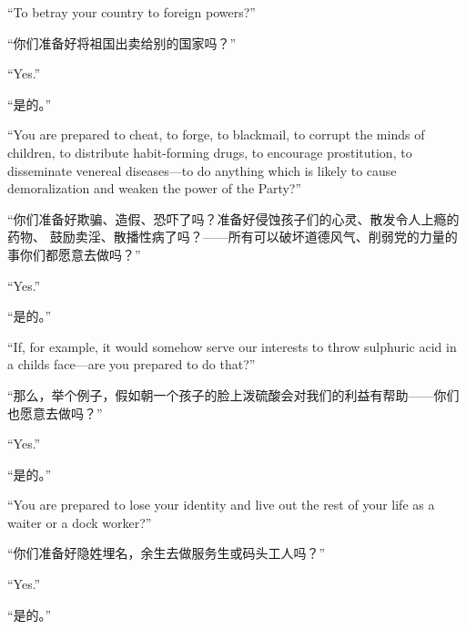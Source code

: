 \begin{paracol}{2}
\switchcolumn*

``To betray your country to foreign powers?''

\switchcolumn

``你们准备好将祖国出卖给别的国家吗？''

\switchcolumn*

``Yes.''

\switchcolumn

``是的。''

\switchcolumn*

``You are prepared to cheat, to forge, to blackmail, to corrupt the minds
of children, to distribute habit-forming drugs, to encourage
prostitution, to disseminate venereal diseases---to do anything which is
likely to cause demoralization and weaken the power of the Party?''

\switchcolumn

``你们准备好欺骗、造假、恐吓了吗？准备好侵蚀孩子们的心灵、散发令人上瘾的药物、
鼓励卖淫、散播性病了吗？——所有可以破坏道德风气、削弱党的力量的事你们都愿意去做吗？''

\switchcolumn*

``Yes.''

\switchcolumn

``是的。''

\switchcolumn*

``If, for example, it would somehow serve our interests to throw
sulphuric acid in a child\textquotesingle s face---are you prepared to
do that?''

\switchcolumn

``那么，举个例子，假如朝一个孩子的脸上泼硫酸会对我们的利益有帮助——你们也愿意去做吗？''

\switchcolumn*

``Yes.''

\switchcolumn

``是的。''

\switchcolumn*

``You are prepared to lose your identity and live out the rest of your
life as a waiter or a dock worker?''

\switchcolumn

``你们准备好隐姓埋名，余生去做服务生或码头工人吗？''

\switchcolumn*

``Yes.''

\switchcolumn

``是的。''

\switchcolumn*


\end{paracol}
